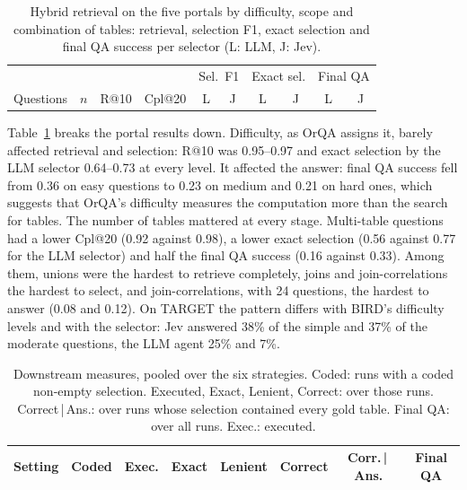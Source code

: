 \begin{table}[t]
\caption{Hybrid retrieval on the five portals by difficulty, scope and
combination of tables: retrieval, selection F1, exact selection and final QA
success per selector (L: LLM, J: Jev).}
\label{tab:difficulty}
\centering
\small
\setlength{\tabcolsep}{3.5pt}
\begin{tabular}{lr|cc|cc|cc|cc}
\hline
 & & & & \multicolumn{2}{c|}{Sel.\ F1} & \multicolumn{2}{c|}{Exact sel.} & \multicolumn{2}{c}{Final QA} \\
Questions & $n$ & R@10 & Cpl@20 & L & J & L & J & L & J \\
\hline
\hline
\end{tabular}
\end{table}

Table~\ref{tab:difficulty} breaks the portal results down. Difficulty, as
OrQA assigns it, barely affected retrieval and selection: R@10 was 0.95--0.97
and exact selection by the LLM selector 0.64--0.73 at every level. It
affected the answer: final QA success fell from 0.36 on easy questions to 0.23
on medium and 0.21 on hard ones, which suggests that OrQA's difficulty
measures the computation more than the search for tables. The number of tables
mattered at every stage. Multi-table questions had a lower Cpl@20 (0.92
against 0.98), a lower exact selection (0.56 against 0.77 for the LLM
selector) and half the final QA success (0.16 against 0.33). Among them,
unions were the hardest to retrieve completely, joins and join-correlations
the hardest to select, and join-correlations, with 24 questions, the hardest
to answer (0.08 and 0.12). On TARGET the pattern differs with BIRD's
difficulty levels and with the selector: Jev answered 38\% of the simple and
37\% of the moderate questions, the LLM agent 25\% and 7\%.

\begin{table}[t]
\caption{Downstream measures, pooled over the six strategies. Coded: runs with
a coded non-empty selection. Executed, Exact, Lenient, Correct: over those
runs. Correct\,|\,Ans.: over runs whose selection contained every gold table.
Final QA: over all runs. Exec.: executed.}
\label{tab:downstream}
\centering
\footnotesize
\setlength{\tabcolsep}{3pt}
\begin{tabular}{lr|cccc|c|c}
\hline
Setting & Coded & Exec. & Exact & Lenient & Correct & Corr.\,|\,Ans. & Final QA \\
\hline
\hline
\end{tabular}
\end{table}


